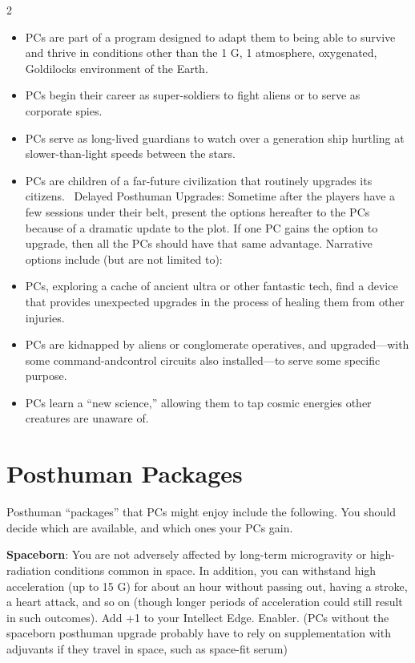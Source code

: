\begin{multicols}{2}
\begin{itemize}
\item PCs are part of a program designed to adapt them to being able to survive and thrive in conditions other than the 1 G, 1 atmosphere, oxygenated, Goldilocks environment of the Earth.
\item PCs begin their career as super-soldiers to fight aliens or to serve as corporate spies.
\item PCs serve as long-lived guardians to watch over a generation ship hurtling at slower-than-light speeds between the stars. 
\item PCs are children of a far-future civilization that routinely upgrades its citizens. 
Delayed Posthuman Upgrades: Sometime after the players have a few sessions under their belt, present the options hereafter to the PCs because of a dramatic update to the plot. If one PC gains the option to upgrade, then all the PCs should have that same advantage. Narrative options include (but are not limited to): 
\item PCs, exploring a cache of ancient ultra or other fantastic tech, find a device that provides unexpected upgrades in the process of healing them from other injuries. 
\item PCs are kidnapped by aliens or conglomerate operatives, and upgraded—with some command-andcontrol circuits also installed—to serve some specific purpose.
\item PCs learn a “new science,” allowing them to tap cosmic energies other creatures are unaware of.
\end{itemize}

\section{Posthuman Packages}

Posthuman “packages” that PCs might enjoy include the following. You should decide which are available, and which ones your PCs gain. 
	
\textbf{Spaceborn}: You are not adversely affected by long-term microgravity or high-radiation conditions common in space. In addition, you can withstand high acceleration (up to 15 G) for about an hour without passing out, having a stroke, a heart attack, and so on (though longer periods of acceleration could still result in such outcomes). Add +1 to your Intellect Edge. Enabler. (PCs without the spaceborn posthuman upgrade probably have to rely on supplementation with adjuvants if they travel in space, such as space-fit serum)


\end{multicols}
